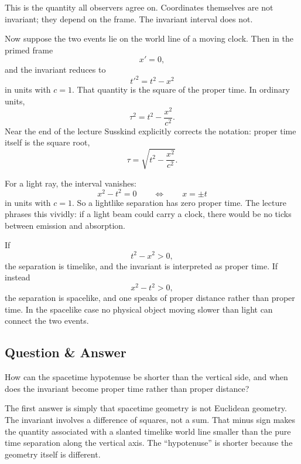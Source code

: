 This is the quantity all observers agree on. Coordinates themselves are not invariant; they depend on the frame. The invariant interval does not.

Now suppose the two events lie on the world line of a moving clock. Then in the primed frame
\begin{equation}
x'=0,
\end{equation}
and the invariant reduces to
\begin{equation}
t'^2=t^2-x^2
\end{equation}
in units with \(c=1\). That quantity is the square of the proper time. In ordinary units,
\begin{equation}
\tau^2=t^2-\frac{x^2}{c^2}.
\end{equation}
Near the end of the lecture Susskind explicitly corrects the notation: proper time itself is the square root,
\begin{equation}
\tau=\sqrt{t^2-\frac{x^2}{c^2}}.
\end{equation}

For a light ray, the interval vanishes:
\begin{equation}
x^2-t^2=0
\qquad \Longleftrightarrow \qquad
x=\pm t
\end{equation}
in units with \(c=1\). So a lightlike separation has zero proper time. The lecture phrases this vividly: if a light beam could carry a clock, there would be no ticks between emission and absorption.

If
\begin{equation}
t^2-x^2>0,
\end{equation}
the separation is timelike, and the invariant is interpreted as proper time. If instead
\begin{equation}
x^2-t^2>0,
\end{equation}
the separation is spacelike, and one speaks of proper distance rather than proper time. In the spacelike case no physical object moving slower than light can connect the two events.

\subsection{Question \& Answer}

How can the spacetime hypotenuse be shorter than the vertical side, and when does the invariant become proper time rather than proper distance?

The first answer is simply that spacetime geometry is not Euclidean geometry. The invariant involves a difference of squares, not a sum. That minus sign makes the quantity associated with a slanted timelike world line smaller than the pure time separation along the vertical axis. The ``hypotenuse'' is shorter because the geometry itself is different.

